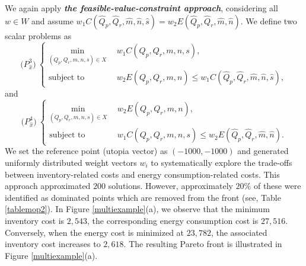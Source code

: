\documentclass[11pt]{article}
\newcommand{\ds}{\displaystyle}
\begin{document}
\noindent \noindent We again apply \textbf{\em the feasible-value-constraint approach}, considering all $w \in W$ and assume
$w_1C(\hat{Q}_p,\hat{Q}_r,\hat{m},\hat{n},\hat{s})=w_2E(\hat{Q}_p,\hat{Q}_r,\hat{m},\hat{n})$. We define two scalar problems as
\begin{equation} \label{nchep3}
\mbox{($P_{\hat{x}}^3$)}\ \left\{\begin{array}{rl} \ds\min_{(Q_p,Q_r,m,n,s) \in  X} & \
\ w_1C(Q_p,Q_r,m,n,s),
\\[4mm]
\mbox{subject to} & \ \ w_2E(Q_p, Q_r, m , n) \leq w_1C(\hat{Q}_p,\hat{Q}_r,\hat{m},\hat{n},\hat{s}),
\end{array}
\right.
\end{equation}
and
\begin{equation} \label{nchep4}
\mbox{($P_{\hat{x}}^4$)}\ \left\{\begin{array}{rl} \ds\min_{(Q_p,Q_r,m,n,s)\in  X} & \
\ w_{2}E(Q_p, Q_r, m , n),
\\[4mm]
\mbox{subject to} & \ \ w_1C(Q_p,Q_r,m,n,s) \leq w_2E(\hat{Q}_p, \hat{Q}_r, \hat{m} , \hat{n}).
\end{array}
\right.
\end{equation}
\noindent We set the reference point (utopia vector) as $(-1000, -1000)$ and generated uniformly distributed weight vectors $w_i$ to systematically explore the trade-offs between inventory-related costs and energy consumption-related costs. This approach approximated $200$ solutions. However, approximately $20\%$ of these were identified as dominated points which are removed from the front (see, Table \ref{tablemop2}). In Figure \ref{multiexample}(a), we observe that the minimum inventory cost is \(2,543\), the corresponding energy consumption cost is \(27,516\). Conversely, when the energy cost is minimized at \(23,782\), the associated inventory cost increases to \(2,618\). The resulting Pareto front is illustrated in Figure \ref{multiexample}(a).
\end{document}
